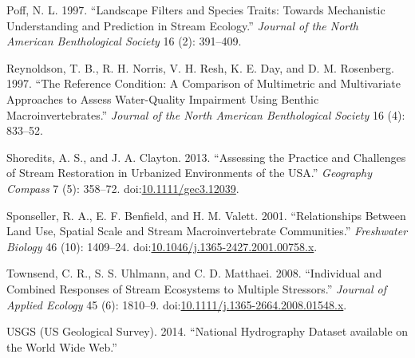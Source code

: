 \documentclass[]{article}
\begin{document}
\hypertarget{ref-Poff97}{}
Poff, N. L. 1997. ``Landscape Filters and Species Traits: Towards
Mechanistic Understanding and Prediction in Stream Ecology.''
\emph{Journal of the North American Benthological Society} 16 (2):
391--409.

\hypertarget{ref-Reynoldson97}{}
Reynoldson, T. B., R. H. Norris, V. H. Resh, K. E. Day, and D. M.
Rosenberg. 1997. ``The Reference Condition: A Comparison of Multimetric
and Multivariate Approaches to Assess Water-Quality Impairment Using
Benthic Macroinvertebrates.'' \emph{Journal of the North American
Benthological Society} 16 (4): 833--52.

\hypertarget{ref-Shoredits13}{}
Shoredits, A. S., and J. A. Clayton. 2013. ``Assessing the Practice and
Challenges of Stream Restoration in Urbanized Environments of the USA.''
\emph{Geography Compass} 7 (5): 358--72.
doi:\href{https://doi.org/10.1111/gec3.12039}{10.1111/gec3.12039}.

\hypertarget{ref-Sponseller01}{}
Sponseller, R. A., E. F. Benfield, and H. M. Valett. 2001.
``Relationships Between Land Use, Spatial Scale and Stream
Macroinvertebrate Communities.'' \emph{Freshwater Biology} 46 (10):
1409--24.
doi:\href{https://doi.org/10.1046/j.1365-2427.2001.00758.x}{10.1046/j.1365-2427.2001.00758.x}.

\hypertarget{ref-Townsend08}{}
Townsend, C. R., S. S. Uhlmann, and C. D. Matthaei. 2008. ``Individual
and Combined Responses of Stream Ecosystems to Multiple Stressors.''
\emph{Journal of Applied Ecology} 45 (6): 1810--9.
doi:\href{https://doi.org/10.1111/j.1365-2664.2008.01548.x}{10.1111/j.1365-2664.2008.01548.x}.

\hypertarget{ref-USGS14}{}
USGS (US Geological Survey). 2014. ``National Hydrography Dataset
available on the World Wide Web.''
\end{document}
